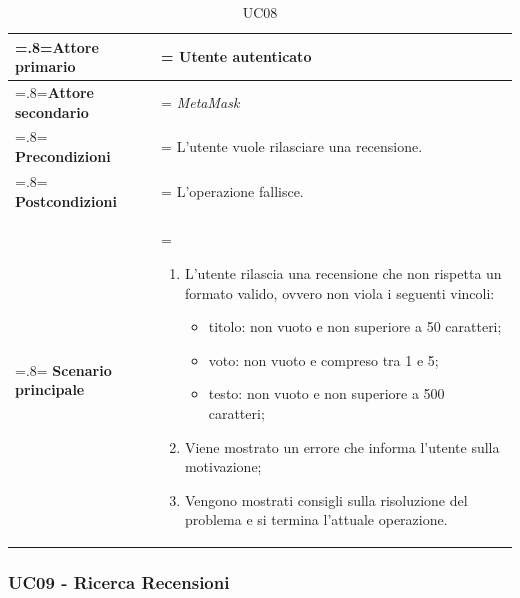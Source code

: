             \begin{table}[H]
                \centering
                \renewcommand{\arraystretch}{1.8}
                \renewcommand\tabularxcolumn[1]{m{#1}}
                \begin{tabularx}{0.9\textwidth} {
                    >{\hsize=.8\hsize\linewidth=\hsize}X
                    >{\hsize=1.2\hsize\linewidth=\hsize}X}
                    \hline
                    \textbf{Attore primario} & Utente autenticato \\
                    \hline
                    \textbf{Attore secondario} & \textit{MetaMask} \\
                    \hline
                    \textbf{Precondizioni} & L'utente vuole rilasciare una recensione. \\
                    \hline
                    \textbf{Postcondizioni} & L'operazione fallisce. \\
                    \hline
                    \textbf{Scenario principale} &
                        \begin{enumerate}
                            \item L'utente rilascia una recensione che non rispetta un formato valido, ovvero non viola i seguenti vincoli:
                            \begin{itemize}
                                \item titolo: non vuoto e non superiore a 50 caratteri;
                                \item voto: non vuoto e compreso tra 1 e 5;
                                \item testo: non vuoto e non superiore a 500 caratteri;
                            \end{itemize}
                            \item Viene mostrato un errore che informa l'utente sulla motivazione;
                            \item Vengono mostrati consigli sulla risoluzione del problema e si termina l'attuale operazione.
                        \end{enumerate} \\
                    \hline
                \end{tabularx}
                \caption{UC08}
            \end{table}

        \subsubsection{UC09 - Ricerca Recensioni}
        \label{UC09}

